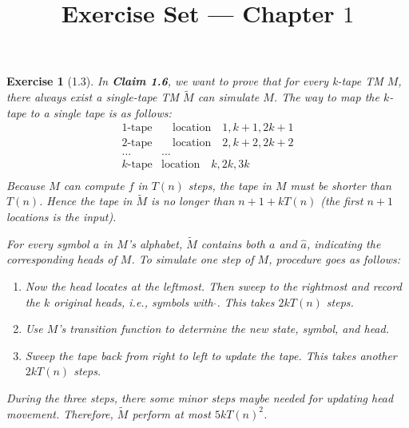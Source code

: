 \documentclass[a4paper]{article}
\title{Exercise Set --- Chapter $1$}
\date{}
\newtheorem*{exercise}{Exercise}
\begin{document}
\maketitle

\begin{exercise}[1.3]
	In \textbf{Claim 1.6}, we want to prove that for every k-tape TM $M$,
    there always exist a single-tape TM $\widetilde{M}$ can simulate $M$.
    The way to map the $k$-tape to a single tape is as follows:
		$$
        \begin{matrix}		
            1\text{-tape}&\quad \text{location}\quad 1, k+1, 2k+1\\			
             2\text{-tape}&\quad \text{location}\quad 2, k+2, 2k+2\\			
			 \dots&\dots\\			
             k\text{-tape}&\text{location}\quad k, 2k, 3k\\			
		\end{matrix}
        $$
	Because $M$ can compute $f$ in $T(n)$ steps, the tape in $M$ must be shorter than $T(n)$.
    Hence the tape in $\widetilde{M}$ is no longer than $n+1+kT(n)$ (the first $n+1$ locations is the input).

	For every symbol $a$ in $M$'s alphabet, $\widetilde{M}$ contains both $a$ and $\widehat{a}$, 
    indicating the corresponding heads of $M$. 
	To simulate one step of $M$, procedure goes as follows:
    \begin{enumerate}
        \item Now the head locates at the leftmost.
            Then sweep to the rightmost and record the $k$ original heads, i.e., symbols with $\widehat{ }$. 
            This takes $2kT(n)$ steps.
        \item Use $M$'s transition function to determine the new state, symbol, and head.
        \item Sweep the tape back from right to left to update the tape. 
            This takes another $2kT(n)$ steps.
    \end{enumerate}
	During the three steps, there some minor steps maybe needed for updating head movement. 
	Therefore, $\widetilde{M}$ perform at most $5kT(n)^2$. 
\end{exercise}
\end{document}
